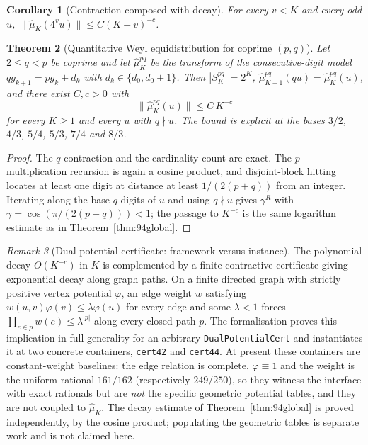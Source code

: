 \documentclass[11pt,a4paper]{article}
\newtheorem{theorem}{Theorem}[section]
\newtheorem{corollary}[theorem]{Corollary}
\theoremstyle{remark}
\newtheorem{remark}[theorem]{Remark}
\begin{document}
\begin{corollary}[Contraction composed with decay]
For every $v < K$ and every odd $u$, $\|\hat\mu_{K}(4^{v} u)\| \le C (K-v)^{-c}$.
\end{corollary}

\begin{theorem}[Quantitative Weyl equidistribution for coprime \texorpdfstring{$(p,q)$}{(p,q)}]
\label{thm:pqweyl}
Let $2 \le q < p$ be coprime and let $\hat\mu^{pq}_{K}$ be the transform of the consecutive-digit model $q g_{k+1} = p g_{k} + d_{k}$ with $d_{k} \in \{d_{0}, d_{0}+1\}$. Then $|S^{pq}_{K}| = 2^{K}$, $\hat\mu^{pq}_{K+1}(q u) = \hat\mu^{pq}_{K}(u)$, and there exist $C, c > 0$ with
\[
  \|\hat\mu^{pq}_{K}(u)\| \le C\, K^{-c}
\]
for every $K \ge 1$ and every $u$ with $q \nmid u$. The bound is explicit at the bases $3/2$, $4/3$, $5/4$, $5/3$, $7/4$ and $8/3$.
\end{theorem}

\begin{proof}
The $q$-contraction and the cardinality count are exact. The $p$-multiplication recursion is again a cosine product, and disjoint-block hitting locates at least one digit at distance at least $1/(2(p+q))$ from an integer. Iterating along the base-$q$ digits of $u$ and using $q \nmid u$ gives $\gamma^{R}$ with $\gamma = \cos(\pi/(2(p+q))) < 1$; the passage to $K^{-c}$ is the same logarithm estimate as in Theorem~\ref{thm:94global}.
\end{proof}

\begin{remark}[Dual-potential certificate: framework versus instance]
\label{rem:dualpotential}
The polynomial decay $O(K^{-c})$ in $K$ is complemented by a finite contractive certificate giving exponential decay along graph paths. On a finite directed graph with strictly positive vertex potential $\varphi$, an edge weight $w$ satisfying $w(u,v)\varphi(v) \le \lambda \varphi(u)$ for every edge and some $\lambda < 1$ forces $\prod_{e \in p} w(e) \le \lambda^{|p|}$ along every closed path $p$. The formalisation proves this implication in full generality for an arbitrary \texttt{DualPotentialCert} and instantiates it at two concrete containers, \texttt{cert42} and \texttt{cert44}. At present these containers are constant-weight baselines: the edge relation is complete, $\varphi \equiv 1$ and the weight is the uniform rational $161/162$ (respectively $249/250$), so they witness the interface with exact rationals but are \emph{not} the specific geometric potential tables, and they are not coupled to $\hat\mu_{K}$. The decay estimate of Theorem~\ref{thm:94global} is proved independently, by the cosine product; populating the geometric tables is separate work and is not claimed here.
\end{remark}
\end{document}
